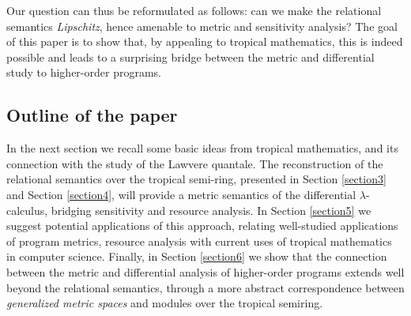 Our question can thus be reformulated as follows: can we make the relational semantics \emph{Lipschitz}, hence amenable to metric and sensitivity analysis? The goal of this paper is to show that, by appealing to tropical mathematics, this is indeed possible and leads to a surprising 
bridge between the metric and differential study to higher-order programs.
%


\subsection{Outline of the paper}

In the next section we recall some basic ideas from tropical mathematics, and its connection with the study of the Lawvere quantale.
The reconstruction of the relational semantics over the tropical semi-ring, presented in Section \ref{section3} and Section \ref{section4}, will provide a metric semantics of the differential $\lambda$-calculus, bridging sensitivity and resource analysis. 
In Section \ref{section5} we suggest potential applications of this approach, relating well-studied applications of program metrics, resource analysis with current uses of tropical mathematics in computer science.  
Finally, in Section \ref{section6} we show that the connection between the metric and differential analysis of higher-order programs extends well beyond the relational semantics, through a more abstract correspondence between  
\emph{generalized metric spaces} and modules over the tropical semiring.


